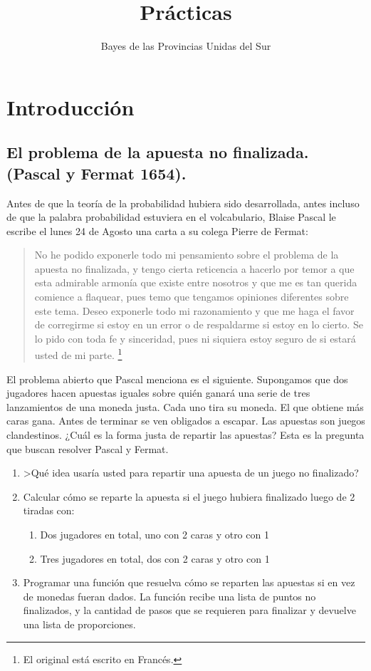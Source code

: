 \documentclass[a4paper,10pt]{article}
\title{Prácticas}
\author{Bayes de las Provincias Unidas del Sur}
\begin{document}
\maketitle

\tableofcontents

\section{Introducción}

\subsection{El problema de la apuesta no finalizada. (Pascal y Fermat 1654).}

Antes de que la teoría de la probabilidad hubiera sido desarrollada, antes incluso de que la palabra probabilidad estuviera en el volcabulario, Blaise Pascal le escribe el lunes 24 de Agosto una carta a su colega Pierre de Fermat:

\begin{quotation}
No he podido exponerle todo mi pensamiento sobre el problema de la apuesta no finalizada, y tengo cierta reticencia a hacerlo por temor a que esta admirable armonía que existe entre nosotros y que me es tan querida comience a flaquear, pues temo que tengamos opiniones diferentes sobre este tema.
Deseo exponerle todo mi razonamiento y que me haga el favor de corregirme si estoy en un error o de respaldarme si estoy en lo cierto.
Se lo pido con toda fe y sinceridad, pues ni siquiera estoy seguro de si estará usted de mi parte.
\footnote{El original está escrito en Francés.}
\end{quotation}

El problema abierto que Pascal menciona es el siguiente. 
Supongamos que dos jugadores hacen apuestas iguales sobre quién ganará una serie de tres lanzamientos de una moneda justa.
Cada uno tira su moneda.
El que obtiene más caras gana.
Antes de terminar se ven obligados a escapar. 
Las apuestas son juegos clandestinos.
¿Cuál es la forma justa de repartir las apuestas?
Esta es la pregunta que buscan resolver Pascal y Fermat.

\begin{enumerate}
 \item >Qué idea usaría usted para repartir una apuesta de un juego no finalizado?
 \item Calcular cómo se reparte la apuesta si el juego hubiera finalizado luego de 2 tiradas con:
 \begin{enumerate}
  \item Dos jugadores en total, uno con 2 caras y otro con 1
  \item Tres jugadores en total, dos con 2 caras y otro con 1
 \end{enumerate}
 \item Programar una función que resuelva cómo se reparten las apuestas si en vez de monedas fueran dados.
 La función recibe una lista de puntos no finalizados, y la cantidad de pasos que se requieren para finalizar y devuelve una lista de proporciones.
\end{enumerate}
\end{document}

